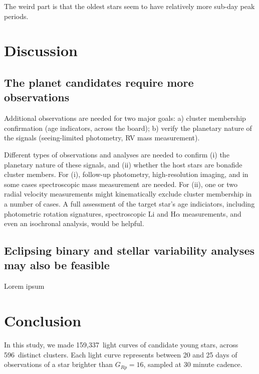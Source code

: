 \documentclass[12pt,twocolumn,tighten]{aastex62}
\newcommand{\numberlcs}{159{,}337\ } %
\newcommand{\numberclusters}{596\ } %
\begin{document}
The weird part is that the oldest stars seem to have relatively more
sub-day peak periods.



\section{Discussion}
\label{sec:discussion}

\subsection{The planet candidates require more observations}
Additional observations are needed for two major goals:
a) cluster membership confirmation
(age indicators, across the board);
b) verify the planetary nature of the signals
(seeing-limited photometry, RV mass measurement).

Different types of observations and analyses are needed to confirm 
(i) the planetary nature of these signals, and
(ii) whether the host stars are bonafide cluster members.
For (i), follow-up photometry, high-resolution imaging, and in some
cases spectroscopic mass measurement are needed.
For (ii), one or two radial velocity measurements might kinematically
exclude cluster membership in a number of cases.
A full assessment of the target star's age indiciators, including
photometric rotation signatures, spectroscopic Li and H$\alpha$
measurements, and even an isochronal analysis, would be helpful.

\subsection{Eclipsing binary and stellar variability analyses may also
be feasible}

Lorem ipsum



\section{Conclusion}
\label{sec:conclusion}

In this study, we made \numberlcs light curves of candidate young
stars, across \numberclusters distinct clusters.
Each light curve represents between 20 and 25 days of observations
of a star brighter than $G_{Rp}=16$, sampled at 30 minute cadence.
\end{document}
